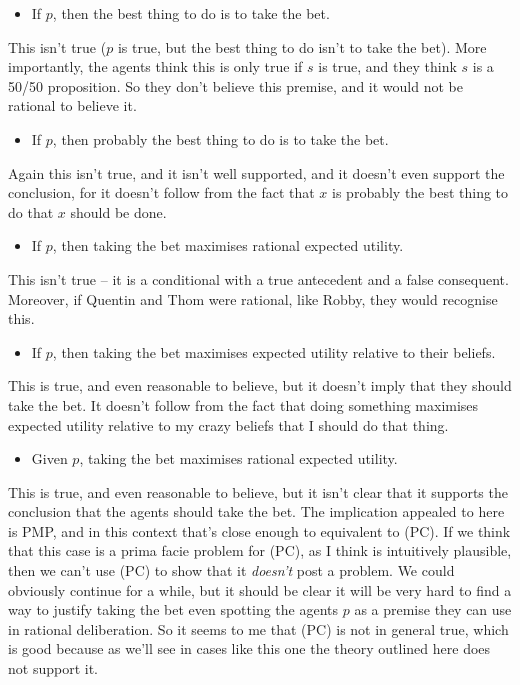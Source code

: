 \begin{itemize}
\item If \(p\), then the best thing to do is to take the bet.
\end{itemize}

\noindent This isn't true (\(p\) is true, but the best thing to do isn't to take the bet). More importantly, the agents think this is only true if \(s\) is true, and they think \(s\) is a 50/50 proposition. So they don't believe this premise, and it would not be rational to believe it.

\begin{itemize}
\item If \(p\), then probably the best thing to do is to take the bet.
\end{itemize}

\noindent Again this isn't true, and it isn't well supported, and it doesn't even support the conclusion, for it doesn't follow from the fact that \(x\) is probably the best thing to do that \(x\) should be done.

\begin{itemize}
\item If \(p\), then taking the bet maximises rational expected utility.
\end{itemize}

\noindent This isn't true -- it is a conditional with a true antecedent and a false consequent. Moreover, if Quentin and Thom were rational, like Robby, they would recognise this.

\begin{itemize}
\item If \(p\), then taking the bet maximises expected utility relative to their beliefs.
\end{itemize}

\noindent This is true, and even reasonable to believe, but it doesn't imply that they should take the bet. It doesn't follow from the fact that doing something maximises expected utility relative to my crazy beliefs that I should do that thing.

\begin{itemize}
\item Given \(p\), taking the bet maximises rational expected utility.
\end{itemize}

\noindent This is true, and even reasonable to believe, but it isn't clear that it supports the conclusion that the agents should take the bet. The implication appealed to here is PMP, and in this context that's close enough to equivalent to (PC). If we think that this case is a prima facie problem for (PC), as I think is intuitively plausible, then we can't use (PC) to show that it \textit{doesn't} post a problem. We could obviously continue for a while, but it should be clear it will be very hard to find a way to justify taking the bet even spotting the agents \(p\) as a premise they can use in rational deliberation. So it seems to me that (PC) is not in general true, which is good because as we'll see in cases like this one the theory outlined here does not support it.

